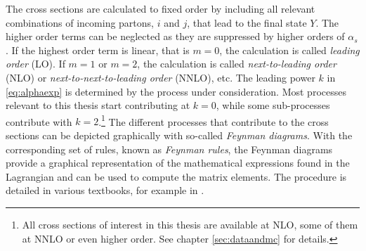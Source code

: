 The cross sections are calculated to fixed order by including all relevant combinations of incoming partons, $i$ and $j$, that lead to the final state $Y$. The higher order terms can be neglected as they are suppressed by higher orders of $\alpha_s$. 
If the highest order term is linear, that is $m=0$, the calculation is called \emph{leading order} (LO). If $m=1$ or $m=2$, the calculation is called \emph{next-to-leading order} (NLO) or \emph{next-to-next-to-leading order} (NNLO),  etc. 
The leading power $k$ in \cref{eq:alphaexp} is determined by the process under consideration. Most processes relevant to this thesis start contributing at $k=0$, while some sub-processes contribute with $k=2$.\footnote{All cross sections of interest in this thesis are available at NLO, some of them at NNLO or even higher order. See chapter \cref{sec:dataandmc} for details.}
The different processes that contribute to the cross sections can be depicted graphically with so-called \emph{Feynman diagrams}. 
With the corresponding set of rules, known as \emph{Feynman rules}, the Feynman diagrams provide a graphical representation of the mathematical expressions found in the Lagrangian and can be used to compute the matrix elements. 
The procedure is detailed in various textbooks, for example in .


